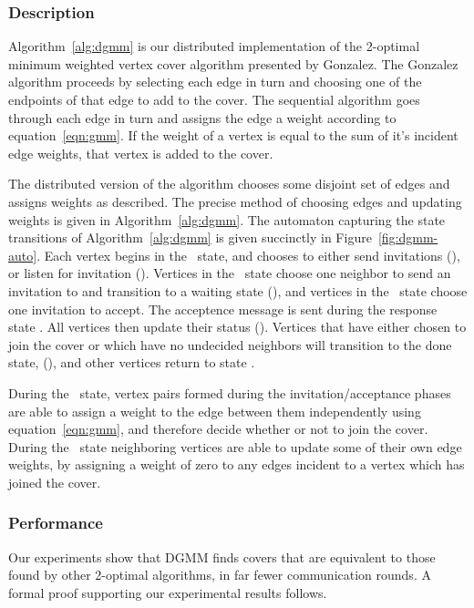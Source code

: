 \label{sub:algorithms-dgmm}
\subsubsection{Description}
Algorithm~\ref{alg:dgmm} is our distributed implementation of the 2-optimal minimum weighted vertex cover algorithm presented by Gonzalez.\cite{Gonzalez1995129} The Gonzalez algorithm proceeds by selecting each edge in turn and choosing one of the endpoints of that edge to add to the cover. The sequential algorithm goes through each edge in turn and assigns the edge a weight according to equation~\ref{eqn:gmm}. If the weight of a vertex is equal to the sum of it's incident edge weights, that vertex is added to the cover. 



The distributed version of the algorithm chooses some disjoint set of edges and assigns weights as described. The precise method of choosing edges and updating weights is given in Algorithm~\ref{alg:dgmm}. The automaton capturing the state transitions of Algorithm~\ref{alg:dgmm} is given succinctly in Figure~\ref{fig:dgmm-auto}. Each vertex begins in the \cCd\ state, and chooses to either send invitations (\cId), or listen for invitation (\cLd). Vertices in the \cId\ state choose one neighbor to send an invitation to and transition to a waiting state (\cWd), and vertices in the \cLd\ state choose one invitation to accept. The acceptence message is sent during the response state \cRd. All vertices then update their status (\cUd). Vertices that have either chosen to join the cover or which have no undecided neighbors will transition to the done state, (\cDd), and other vertices return to state \cCd.  



During the \cUd\ state, vertex pairs formed during the invitation/acceptance phases are able to assign a weight to the edge between them independently using equation~\ref{eqn:gmm}, and therefore decide whether or not to join the cover. During the \cEd\ state neighboring vertices are able to update some of their own edge weights, by assigning a weight of zero to any edges incident to a vertex which has joined the cover.



\subsubsection{Performance}

Our experiments show that DGMM finds covers that are equivalent to those found by other 2-optimal algorithms, in far fewer communication rounds. A formal proof supporting our experimental results follows.



